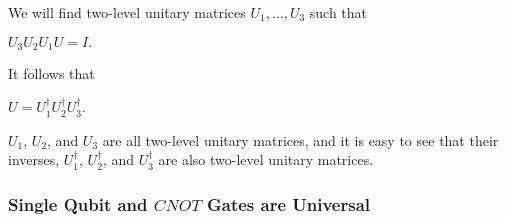 \documentclass{article}
\begin{document}
We will find two-level unitary matrices $U_1,\dots,U_3$ such that
\begin{center}$U_3 U_2 U_1 U = I.$\end{center}

It follows that
\begin{center}$U = U_{1}^{\dagger}U_{2}^{\dagger}U_{3}^{\dagger}.$\end{center}

$U_1$, $U_2$, and $U_3$ are all two-level unitary matrices, and it is easy to
see that their inverses, $U_{1}^{\dagger}$, $U_{2}^{\dagger}$, and
$U_{3}^{\dagger}$ are also two-level unitary matrices.

\subsubsection{Single Qubit and $CNOT$ Gates are Universal}
\end{document}
